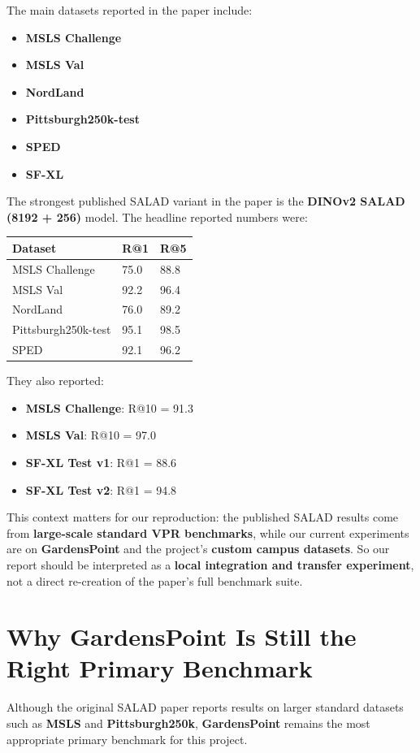 \documentclass[11pt]{article}
\begin{document}
The main datasets reported in the paper include:
\begin{itemize}[leftmargin=*]
  \item \textbf{MSLS Challenge}
  \item \textbf{MSLS Val}
  \item \textbf{NordLand}
  \item \textbf{Pittsburgh250k-test}
  \item \textbf{SPED}
  \item \textbf{SF-XL}
\end{itemize}

The strongest published SALAD variant in the paper is the \textbf{DINOv2 SALAD (8192 + 256)} model. The headline reported numbers were:

\begin{center}
\begin{tabular}{L{3.3cm}L{1.7cm}L{1.7cm}}
\toprule
\textbf{Dataset} & \textbf{R@1} & \textbf{R@5} \\
\midrule
MSLS Challenge & 75.0 & 88.8 \\
MSLS Val & 92.2 & 96.4 \\
NordLand & 76.0 & 89.2 \\
Pittsburgh250k-test & 95.1 & 98.5 \\
SPED & 92.1 & 96.2 \\
\bottomrule
\end{tabular}
\end{center}

They also reported:
\begin{itemize}[leftmargin=*]
  \item \textbf{MSLS Challenge}: R@10 = 91.3
  \item \textbf{MSLS Val}: R@10 = 97.0
  \item \textbf{SF-XL Test v1}: R@1 = 88.6
  \item \textbf{SF-XL Test v2}: R@1 = 94.8
\end{itemize}

This context matters for our reproduction: the published SALAD results come from \textbf{large-scale standard VPR benchmarks}, while our current experiments are on \textbf{GardensPoint} and the project's \textbf{custom campus datasets}. So our report should be interpreted as a \textbf{local integration and transfer experiment}, not a direct re-creation of the paper's full benchmark suite.

\section*{Why GardensPoint Is Still the Right Primary Benchmark}
Although the original SALAD paper reports results on larger standard datasets such as \textbf{MSLS} and \textbf{Pittsburgh250k}, \textbf{GardensPoint} remains the most appropriate primary benchmark for this project.
\end{document}
